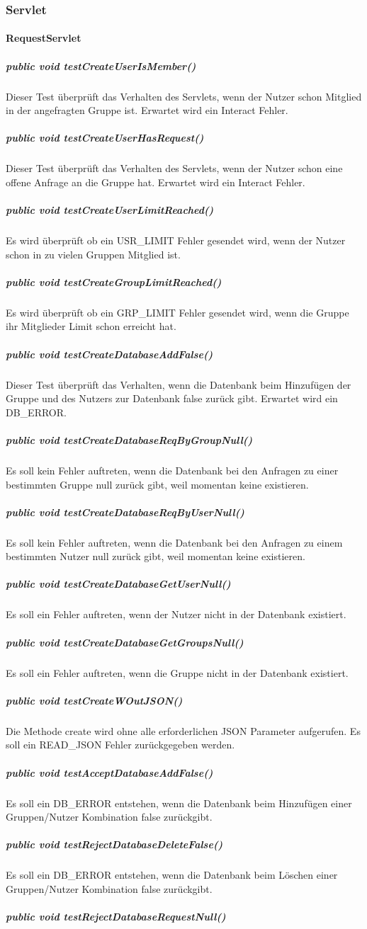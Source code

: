 \documentclass{scrartcl}
\begin{document}
\subsubsection{Servlet}

\paragraph{RequestServlet}
\subparagraph{public void testCreateUserIsMember()}
Dieser Test überprüft das Verhalten des Servlets, wenn der Nutzer schon Mitglied in der angefragten Gruppe ist. Erwartet wird ein Interact Fehler.
\subparagraph{public void testCreateUserHasRequest()}
Dieser Test überprüft das Verhalten des Servlets, wenn der Nutzer schon eine offene Anfrage an die Gruppe hat. Erwartet wird ein Interact Fehler.
\subparagraph{public void testCreateUserLimitReached()}
Es wird überprüft ob ein USR\_LIMIT Fehler gesendet wird, wenn der Nutzer schon in zu vielen Gruppen Mitglied ist.
\subparagraph{public void testCreateGroupLimitReached()}
Es wird überprüft ob ein GRP\_LIMIT Fehler gesendet wird, wenn die Gruppe ihr Mitglieder Limit schon erreicht hat.
\subparagraph{public void testCreateDatabaseAddFalse()}
Dieser Test überprüft das Verhalten, wenn die Datenbank beim Hinzufügen der Gruppe und des Nutzers zur Datenbank false zurück gibt. Erwartet wird ein DB\_ERROR.
\subparagraph{public void testCreateDatabaseReqByGroupNull()}
Es soll kein Fehler auftreten, wenn die Datenbank bei den Anfragen zu einer bestimmten Gruppe null zurück gibt, weil momentan keine existieren.
\subparagraph{public void testCreateDatabaseReqByUserNull()}
Es soll kein Fehler auftreten, wenn die Datenbank bei den Anfragen zu einem bestimmten Nutzer null zurück gibt, weil momentan keine existieren.
\subparagraph{public void testCreateDatabaseGetUserNull()}
Es soll ein Fehler auftreten, wenn der Nutzer nicht in der Datenbank existiert.
\subparagraph{public void testCreateDatabaseGetGroupsNull() }
Es soll ein Fehler auftreten, wenn die Gruppe nicht in der Datenbank existiert.
\subparagraph{public void testCreateWOutJSON()}
Die Methode create wird ohne alle erforderlichen JSON Parameter aufgerufen. Es soll ein READ\_JSON Fehler zurückgegeben werden.
\subparagraph{public void testAcceptDatabaseAddFalse()}
Es soll ein DB\_ERROR entstehen, wenn die Datenbank beim Hinzufügen einer Gruppen/Nutzer Kombination false zurückgibt.
\subparagraph{public void testRejectDatabaseDeleteFalse()}
Es soll ein DB\_ERROR entstehen, wenn die Datenbank beim Löschen einer Gruppen/Nutzer Kombination false zurückgibt.
\subparagraph{public void testRejectDatabaseRequestNull()}
\end{document}

